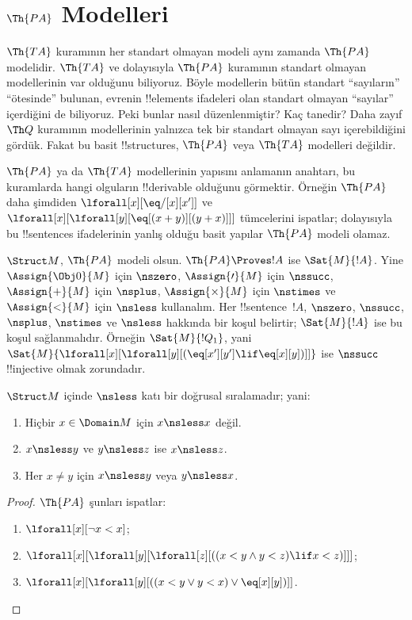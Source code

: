 \documentclass[../../../include/open-logic-section]{subfiles}
\begin{document}
\section{$\Th{PA}$ Modelleri}

\begin{explain}
$\Th{TA}$ kuramının her standart olmayan modeli aynı zamanda
$\Th{PA}$ modelidir. $\Th{TA}$ ve dolayısıyla $\Th{PA}$ kuramının
standart olmayan modellerinin var olduğunu biliyoruz. Böyle modellerin
bütün standart ``sayıların'' ``ötesinde'' bulunan, evrenin
!!{element}s ifadeleri olan standart olmayan ``sayılar'' içerdiğini de
biliyoruz. Peki bunlar nasıl düzenlenmiştir? Kaç tanedir? Daha zayıf
$\Th Q$ kuramının modellerinin yalnızca tek bir standart olmayan sayı
içerebildiğini gördük. Fakat bu basit !!{structure}s, $\Th{PA}$ veya
$\Th{TA}$ modelleri değildir.

$\Th{PA}$ ya da $\Th{TA}$ modellerinin yapısını anlamanın anahtarı,
bu kuramlarda hangi olguların !!{derivable} olduğunu görmektir.
Örneğin $\Th{PA}$ daha şimdiden
$\lforall[x][\eq/[x][x']]$ ve
$\lforall[x][\lforall[y][\eq[(x+y)][(y+x)]]]$ tümcelerini ispatlar;
dolayısıyla bu !!{sentence}s ifadelerinin yanlış olduğu basit yapılar
$\Th{PA}$ modeli olamaz.

$\Struct M$, $\Th{PA}$ modeli olsun. $\Th{PA}\Proves !A$ ise
$\Sat{M}{!A}$. Yine $\Assign{\Obj0}{M}$ için $\nszero$,
$\Assign{\prime}{M}$ için $\nssucc$, $\Assign{+}{M}$ için $\nsplus$,
$\Assign{\times}{M}$ için $\nstimes$ ve $\Assign{<}{M}$ için
$\nsless$ kullanalım. Her !!{sentence}~$!A$, $\nszero$, $\nssucc$,
$\nsplus$, $\nstimes$ ve $\nsless$ hakkında bir koşul belirtir;
$\Sat{M}{!A}$ ise bu koşul sağlanmalıdır. Örneğin $\Sat{M}{!Q_1}$,
yani
$\Sat{M}{\lforall[x][\lforall[y][(\eq[x'][y']\lif\eq[x][y])]]}$
ise $\nssucc$ !!{injective} olmak zorundadır.
\end{explain}

\begin{prop}
$\Struct M$ içinde $\nsless$ katı bir doğrusal sıralamadır; yani:
\begin{enumerate}
\item Hiçbir $x\in\Domain M$ için $x\nsless x$ değil.
\item $x\nsless y$ ve $y\nsless z$ ise $x\nsless z$.
\item Her $x\neq y$ için $x\nsless y$ veya $y\nsless x$.
\end{enumerate}
\end{prop}

\begin{proof}
$\Th{PA}$ şunları ispatlar:
\begin{enumerate}
\item $\lforall[x][\lnot x < x]$;
\item $\lforall[x][\lforall[y][\lforall[z][((x < y \land y < z) \lif x < z)]]]$;
\item $\lforall[x][\lforall[y][((x < y \lor y < x) \lor \eq[x][y])]]$.
\end{enumerate}
\end{proof}
\end{document}
